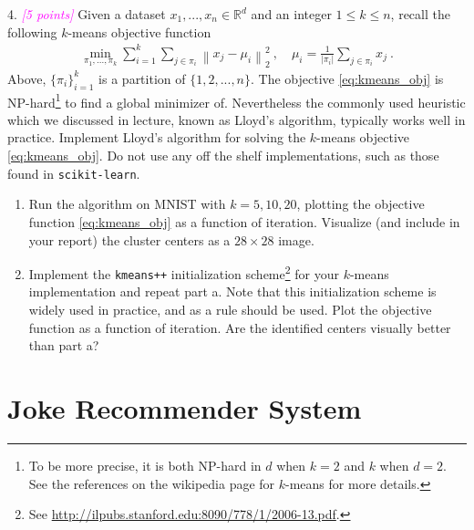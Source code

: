 \documentclass{article}
\newcommand{\field}[1]{\mathbb{#1}}
\newcommand{\1}{\mathbf{1}}
\newcommand{\R}{\field{R}} %
\newcommand{\norm}[1]{\left\|#1\right\|}
\newcommand{\grade}[1]{\small\textcolor{magenta}{\emph{[#1 points]}} \normalsize}
\begin{document}
4. \grade{5} Given a dataset $x_1,..., x_n \in \R^{d}$ and an integer $1 \leq k \leq n$, recall the following $k$-means objective function
\begin{align}
    \min_{\pi_1, ..., \pi_k} \sum_{i=1}^{k} \sum_{j \in \pi_i} \norm{ x_j - \mu_{i} }^2_2 \ , \quad \mu_i = \frac{1}{|\pi_i|} \sum_{j \in \pi_i} x_j \ . \label{eq:kmeans_obj}
\end{align}
Above, $\{\pi_i\}_{i=1}^{k}$ is a partition of $\{1, 2, ..., n\}$. The objective \eqref{eq:kmeans_obj} is NP-hard\footnote{
To be more precise, it is both NP-hard in $d$ when $k=2$ and $k$ when $d=2$.
See the references on the wikipedia page for $k$-means for more details.
} to find a global minimizer of. Nevertheless the commonly used heuristic which we discussed in lecture, known as Lloyd's algorithm, typically works well in practice.
Implement Lloyd's algorithm for solving the $k$-means objective \eqref{eq:kmeans_obj}.
Do not use any off the shelf implementations, such as those found in \texttt{scikit-learn}.
\begin{enumerate}
    \item Run the algorithm on MNIST with $k=5,10,20$, plotting the objective function \eqref{eq:kmeans_obj} as a function of iteration. Visualize (and include in your report) the cluster centers as a $28\times 28$ image.
    \item Implement the \texttt{kmeans++} initialization scheme\footnote{See \url{http://ilpubs.stanford.edu:8090/778/1/2006-13.pdf}.} for your
        $k$-means implementation and repeat part a.  Note that this initialization scheme is widely used in practice, and as a rule should be used. Plot the objective function as a function of iteration. Are the identified centers visually better than part a? 
\end{enumerate}



\section{Joke Recommender System}
\end{document}
